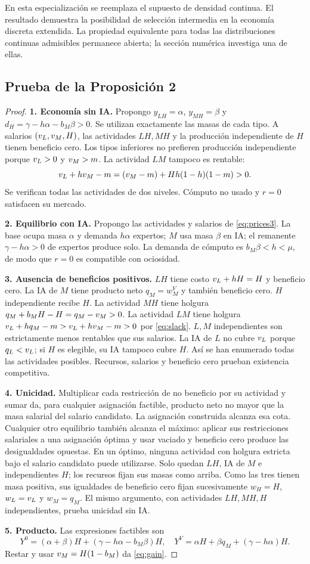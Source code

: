 \documentclass[11pt]{article}
\begin{document}
En esta especialización se reemplaza el supuesto de densidad continua. El resultado demuestra la posibilidad de selección intermedia en la economía discreta extendida. La propiedad equivalente para todas las distribuciones continuas admisibles permanece abierta; la sección numérica investiga una de ellas.
\newpage
\subsection{Prueba de la Proposición 2}
\begin{proof}
\textbf{1. Economía sin IA.} Propongo $y_{LH}=\alpha$, $y_{MH}=\beta$ y $d_H=\gamma-h\alpha-b_M\beta>0$. Se utilizan exactamente las masas de cada tipo. A salarios $(v_L,v_M,H)$, las actividades $LH,MH$ y la producción independiente de $H$ tienen beneficio cero. Los tipos inferiores no prefieren producción independiente porque $v_L>0$ y $v_M>m$. La actividad $LM$ tampoco es rentable:
\begin{equation}\label{eq:slack}
 v_L+hv_M-m=(v_M-m)+Hh(1-h)(1-m)>0.
\end{equation}
Se verifican todas las actividades de dos niveles. Cómputo no usado y $r=0$ satisfacen su mercado.

\textbf{2. Equilibrio con IA.} Propongo las actividades y salarios de \eqref{eq:prices3}. La base ocupa masa $\alpha$ y demanda $h\alpha$ expertos; $M$ usa masa $\beta$ en IA; el remanente $\gamma-h\alpha>0$ de expertos produce solo. La demanda de cómputo es $b_M\beta<h<\mu$, de modo que $r=0$ es compatible con ociosidad.

\textbf{3. Ausencia de beneficios positivos.} $LH$ tiene costo $v_L+hH=H$ y beneficio cero. La IA de $M$ tiene producto neto $q_M=w^V_M$ y también beneficio cero. $H$ independiente recibe $H$. La actividad $MH$ tiene holgura $q_M+b_MH-H=q_M-v_M>0$. La actividad $LM$ tiene holgura $v_L+hq_M-m>v_L+hv_M-m>0$ por \eqref{eq:slack}. $L,M$ independientes son estrictamente menos rentables que sus salarios. La IA de $L$ no cubre $v_L$ porque $q_L<v_L$; si $H$ es elegible, su IA tampoco cubre $H$. Así se han enumerado todas las actividades posibles. Recursos, salarios y beneficio cero prueban existencia competitiva.

\textbf{4. Unicidad.} Multiplicar cada restricción de no beneficio por su actividad y sumar da, para cualquier asignación factible, producto neto no mayor que la masa salarial del salario candidato. La asignación construida alcanza esa cota. Cualquier otro equilibrio también alcanza el máximo: aplicar sus restricciones salariales a una asignación óptima y usar vaciado y beneficio cero produce las desigualdades opuestas. En un óptimo, ninguna actividad con holgura estricta bajo el salario candidato puede utilizarse. Solo quedan $LH$, IA de $M$ e independientes $H$; los recursos fijan sus masas como arriba. Como las tres tienen masa positiva, sus igualdades de beneficio cero fijan sucesivamente $w_H=H$, $w_L=v_L$ y $w_M=q_M$. El mismo argumento, con actividades $LH,MH,H$ independientes, prueba unicidad sin IA.

\textbf{5. Producto.} Las expresiones factibles son
\[
Y^0=(\alpha+\beta)H+(\gamma-h\alpha-b_M\beta)H,
\quad Y^V=\alpha H+\beta q_M+(\gamma-h\alpha)H.
\]
Restar y usar $v_M=H(1-b_M)$ da \eqref{eq:gain}.
\end{proof}
\end{document}
